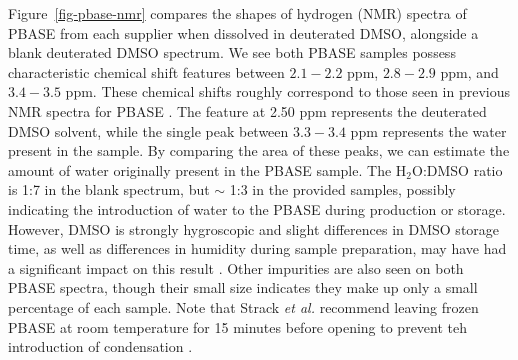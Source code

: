 \documentclass[
  a4paper,
]{scrbook}
\begin{document}
Figure~\ref{fig-pbase-nmr} compares the shapes of hydrogen (NMR) spectra
of PBASE from each supplier when dissolved in deuterated DMSO, alongside
a blank deuterated DMSO spectrum. We see both PBASE samples possess
characteristic chemical shift features between \(2.1-2.2\) ppm,
\(2.8-2.9\) ppm, and \(3.4-3.5\) ppm. These chemical shifts roughly
correspond to those seen in previous NMR spectra for PBASE
\autocite{NMR2}. The feature at 2.50 ppm represents the deuterated DMSO
solvent, while the single peak between \(3.3-3.4\) ppm represents the
water present in the sample. By comparing the area of these peaks, we
can estimate the amount of water originally present in the PBASE sample.
The H\(_{2}\)O:DMSO ratio is 1:7 in the blank spectrum, but \(\sim\) 1:3
in the provided samples, possibly indicating the introduction of water
to the PBASE during production or storage. However, DMSO is strongly
hygroscopic and slight differences in DMSO storage time, as well as
differences in humidity during sample preparation, may have had a
significant impact on this result \autocite{Lebel1962}. Other impurities
are also seen on both PBASE spectra, though their small size indicates
they make up only a small percentage of each sample. Note that Strack
\emph{et al.} recommend leaving frozen PBASE at room temperature for 15
minutes before opening to prevent teh introduction of condensation
\autocite{Strack2013}.
\end{document}
